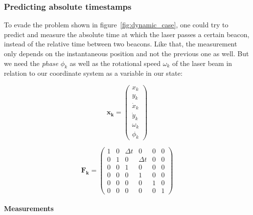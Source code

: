 \documentclass[a4paper, 12pt]{paper}
\begin{document}
\subsubsection{Predicting absolute timestamps}

To evade the problem shown in figure~\ref{fig:dynamic_case}, one could try to
predict and measure the absolute time at which the laser passes a certain
beacon, instead of the relative time between two beacons. Like that, the
measurement only depends on the instantaneous position and not the previous
one as well. But we need the \emph{phase} $\phi_k$ as well as the rotational
speed $\omega_k$ of the laser beam in relation to our coordinate system as a
variable in our state:

\begin{equation}
    \mathbf{x_k} = \left( \begin{array}{c} x_k     \\
                                           y_k     \\
                                           \dot{x}_k \\
                                           \dot{y}_k \\
                                           \omega_k \\
                                           \phi_k \end{array} \right)
\label{eq:ekf_state_2}
\end{equation}

\begin{equation}
    \mathbf{F_k} = \left( \begin{array}{cccccc}
                    1 & 0 & \Delta t & 0 & 0 & 0 \\
                    0 & 1 & 0 & \Delta t & 0 & 0  \\
                    0 & 0 & 1 & 0 & 0 & 0 \\
                    0 & 0 & 0 & 1 & 0 & 0 \\
                    0 & 0 & 0 & 0 & 1 & 0 \\
                    0 & 0 & 0 & 0 & 0 & 1
                    \end{array} \right)
\label{eq:ekf_state_trans_2}
\end{equation}

\paragraph{Measurements}
\end{document}

